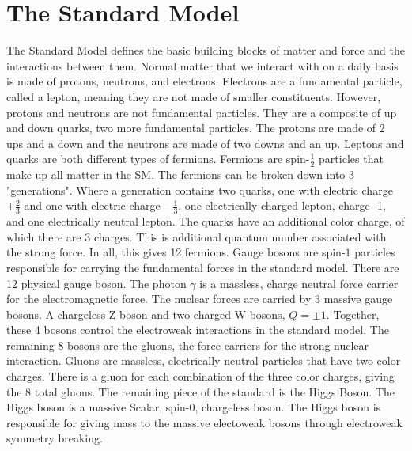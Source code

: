 \section{The Standard Model}
The Standard Model defines the basic building blocks of matter and force and the interactions between them. Normal matter that we interact with on a daily basis is made of protons, neutrons, and electrons. Electrons are a fundamental particle, called a lepton, meaning they are not made of smaller constituents. However, protons and neutrons are not fundamental particles. They are a composite of up and down quarks, two more fundamental particles. The protons are made of 2 ups and a down and the neutrons are made of two downs and an up. Leptons and quarks are both different types of fermions. \linebreak
\indent Fermions are spin-${\frac{1}{2}}$ particles that make up all matter in the SM. The fermions can be broken down into 3 "generations". Where a generation contains two quarks, one with electric charge ${+\frac{2}{3}}$ and one with electric charge ${-\frac{1}{3}}$, one electrically charged lepton, charge -1, and one electrically neutral lepton. The quarks have an additional color charge, of which there are 3 charges. This is additional quantum number associated with the strong force. In all, this gives 12 fermions. \linebreak
\indent Gauge bosons are spin-${1}$ particles responsible for carrying the fundamental forces in the standard model. There are 12 physical gauge boson. The photon ${\gamma}$ is a massless, charge neutral force carrier for the electromagnetic force. The nuclear forces are carried by 3 massive gauge bosons. A chargeless Z boson and two charged W bosons, ${Q = \pm 1}$. Together, these 4 bosons control the electroweak interactions in the standard model. The remaining 8 bosons are the gluons, the force carriers for the strong nuclear interaction. Gluons are massless, electrically neutral particles that have two color charges. There is a gluon for each combination of the three color charges, giving the 8 total gluons. \linebreak
\indent The remaining piece of the standard is the Higgs Boson. The Higgs boson is a massive Scalar, spin-${0}$, chargeless boson. The Higgs boson is responsible for giving mass to the massive electoweak bosons through electroweak symmetry breaking.
